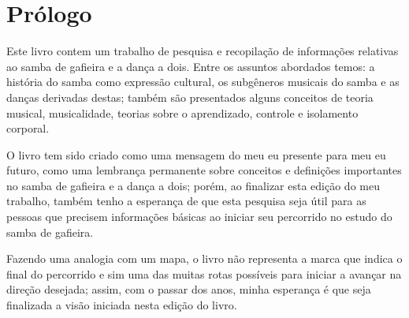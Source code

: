 
\cleardoublepage %
\newpage
\thispagestyle{empty}

\chapter*{Prólogo}
Este livro contem um trabalho de pesquisa e recopilação de informações relativas ao samba de gafieira
e a dança a dois. Entre os assuntos abordados temos: a história do samba como expressão cultural,
os subgêneros musicais do samba e as danças derivadas destas; 
também são presentados alguns conceitos de teoria musical,
musicalidade, teorias sobre o aprendizado, controle e isolamento corporal.  

O livro tem sido criado como uma mensagem do meu eu presente para meu eu futuro,
como uma lembrança permanente sobre conceitos e definições importantes no samba de gafieira e a dança a dois;
porém, ao finalizar esta edição do meu trabalho, 
também tenho a esperança de que esta pesquisa seja útil para as pessoas
que precisem informações básicas ao iniciar seu percorrido no estudo do samba de gafieira.

Fazendo uma analogia com um mapa, 
o livro não representa a marca que indica o final do percorrido 
e sim uma das muitas rotas possíveis para iniciar a avançar na direção desejada;
assim, com o passar dos anos, minha esperança é que seja finalizada a visão iniciada nesta edição do livro.  
